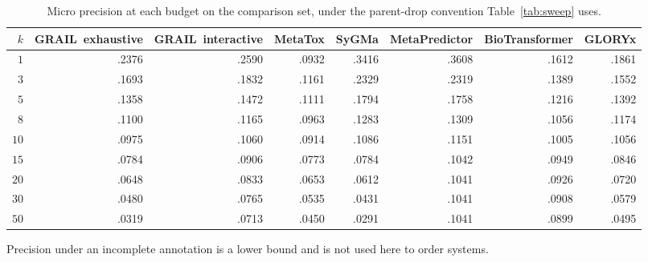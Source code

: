 \begin{table}[t]
\centering\scriptsize
\begin{threeparttable}
\caption{Micro precision at each budget on the comparison set, under the parent-drop convention Table~\ref{tab:sweep} uses.}
\label{tab:si-precision}
\setlength{\tabcolsep}{4pt}
\begin{tabular}{rrrrrrrr}
\toprule
$k$ & GRAIL\ exhaustive & GRAIL\ interactive & MetaTox & SyGMa & MetaPredictor & BioTransformer & GLORYx \\
\midrule
$1$ & .2376 & .2590 & .0932 & .3416 & .3608 & .1612 & .1861 \\
$3$ & .1693 & .1832 & .1161 & .2329 & .2319 & .1389 & .1552 \\
$5$ & .1358 & .1472 & .1111 & .1794 & .1758 & .1216 & .1392 \\
$8$ & .1100 & .1165 & .0963 & .1283 & .1309 & .1056 & .1174 \\
$10$ & .0975 & .1060 & .0914 & .1086 & .1151 & .1005 & .1056 \\
$15$ & .0784 & .0906 & .0773 & .0784 & .1042 & .0949 & .0846 \\
$20$ & .0648 & .0833 & .0653 & .0612 & .1041 & .0926 & .0720 \\
$30$ & .0480 & .0765 & .0535 & .0431 & .1041 & .0908 & .0579 \\
$50$ & .0319 & .0713 & .0450 & .0291 & .1041 & .0899 & .0495 \\
\bottomrule
\end{tabular}
\begin{tablenotes}[flushleft]\footnotesize
\item Precision under an incomplete annotation is a lower bound and is not used here to order systems.
\end{tablenotes}
\end{threeparttable}
\end{table}
